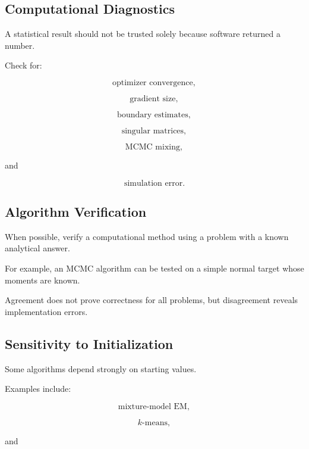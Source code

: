 \subsection{Computational Diagnostics}
\label{subsec:computational-diagnostics}

A statistical result should not be trusted solely because software
returned a number.

Check for:

\[
\boxed{
\text{optimizer convergence},
}
\]

\[
\boxed{
\text{gradient size},
}
\]

\[
\boxed{
\text{boundary estimates},
}
\]

\[
\boxed{
\text{singular matrices},
}
\]

\[
\boxed{
\text{MCMC mixing},
}
\]

and

\[
\boxed{
\text{simulation error}.
}
\]

\subsection{Algorithm Verification}
\label{subsec:algorithm-verification}

When possible, verify a computational method using a problem with a known
analytical answer.

For example, an MCMC algorithm can be tested on a simple normal target
whose moments are known.

Agreement does not prove correctness for all problems, but disagreement
reveals implementation errors.

\subsection{Sensitivity to Initialization}
\label{subsec:sensitivity-initialization}

Some algorithms depend strongly on starting values.

Examples include:

\[
\boxed{
\text{mixture-model EM},
}
\]

\[
\boxed{
k\text{-means},
}
\]

and

